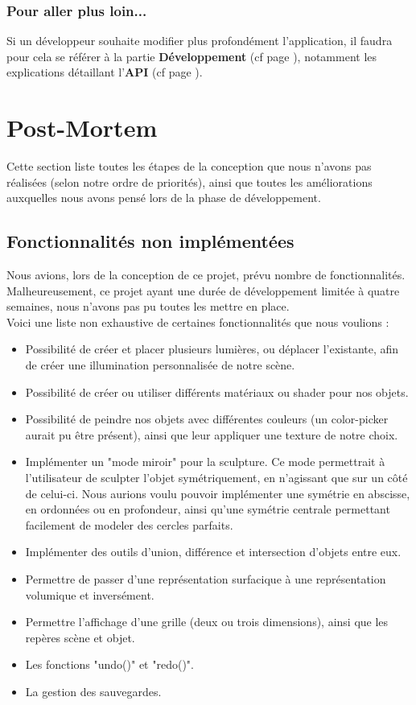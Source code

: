 \documentclass[a4paper]{memoir}
\begin{document}
			\subsection{Pour aller plus loin...}
				Si un développeur souhaite modifier plus profondément l'application, il faudra pour cela se référer à la partie \textbf{Développement} (cf 
				page \pageref{dev}), notamment les explications détaillant l'\textbf{API} (cf page \pageref{api-dev}).

	\chapter{Post-Mortem}
		Cette section liste toutes les étapes de la conception que nous n'avons pas réalisées (selon notre ordre de priorités), ainsi que toutes les 
		améliorations auxquelles nous avons pensé lors de la phase de développement.
		
		\section{Fonctionnalités non implémentées}
			Nous avions, lors de la conception de ce projet, prévu nombre de fonctionnalités. Malheureusement, ce projet ayant une durée de 
			développement limitée à quatre semaines, nous n'avons pas pu toutes les mettre en place.\\
			Voici une liste non exhaustive de certaines fonctionnalités que nous voulions :
			\begin{itemize}
				\item Possibilité de créer et placer plusieurs lumières, ou déplacer l'existante, afin de créer une illumination personnalisée de notre 
				scène.
				\item Possibilité de créer ou utiliser différents matériaux ou shader pour nos objets.
				\item Possibilité de peindre nos objets avec différentes couleurs (un color-picker aurait pu être présent), ainsi que leur appliquer 
				une texture de notre choix.
				\item Implémenter un "mode miroir" pour la sculpture. Ce mode permettrait à l'utilisateur de sculpter l'objet symétriquement, en 
				n'agissant que sur un côté de celui-ci. Nous aurions voulu pouvoir implémenter une symétrie en abscisse, en ordonnées ou en profondeur, 
				ainsi qu'une symétrie centrale permettant facilement de modeler des cercles parfaits.
				\item Implémenter des outils d'union, différence et intersection d'objets entre eux.
				\item Permettre de passer d'une représentation surfacique à une représentation volumique et inversément.
				\item Permettre l'affichage d'une grille (deux ou trois dimensions), ainsi que les repères scène et objet.
				\item Les fonctions "undo()" et "redo()".
				\item La gestion des sauvegardes.
			\end{itemize}
			
\end{document}
